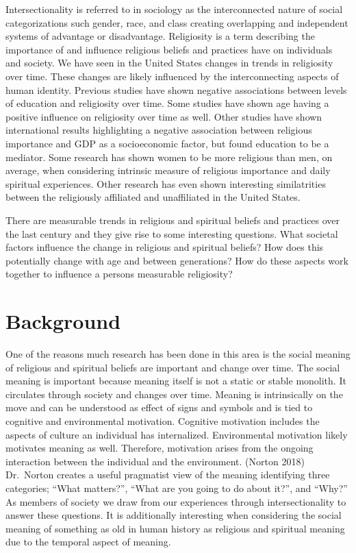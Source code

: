 \documentclass[
  12pt,
  letterpaper,
]{article}
\begin{document}
Intersectionality is referred to in sociology as the interconnected
nature of social categorizations such gender, race, and class creating
overlapping and independent systems of advantage or disadvantage.
Religiosity is a term describing the importance of and influence
religious beliefs and practices have on individuals and society. We have
seen in the United States changes in trends in religiosity over time.
These changes are likely influenced by the interconnecting aspects of
human identity. Previous studies have shown negative associations
between levels of education and religiosity over time. Some studies have
shown age having a positive influence on religiosity over time as well.
Other studies have shown international results highlighting a negative
association between religious importance and GDP as a socioeconomic
factor, but found education to be a mediator. Some research has shown
women to be more religious than men, on average, when considering
intrinsic measure of religious importance and daily spiritual
experiences. Other research has even shown interesting similatrities
between the religiously affiliated and unaffiliated in the United
States.

There are measurable trends in religious and spiritual beliefs and
practices over the last century and they give rise to some interesting
questions. What societal factors influence the change in religious and
spiritual beliefs? How does this potentially change with age and between
generations? How do these aspects work together to influence a persons
measurable religiosity?

\hypertarget{background}{%
\section{Background}\label{background}}

One of the reasons much research has been done in this area is the
social meaning of religious and spiritual beliefs are important and
change over time. The social meaning is important because meaning itself
is not a static or stable monolith. It circulates through society and
changes over time. Meaning is intrinsically on the move and can be
understood as effect of signs and symbols and is tied to cognitive and
environmental motivation. Cognitive motivation includes the aspects of
culture an individual has internalized. Environmental motivation likely
motivates meaning as well. Therefore, motivation arises from the ongoing
interaction between the individual and the environment. (Norton 2018)
Dr.~Norton creates a useful pragmatist view of the meaning identifying
three categories; ``What matters?'', ``What are you going to do about
it?'', and ``Why?'' As members of society we draw from our experiences
through intersectionality to answer these questions. It is additionally
interesting when considering the social meaning of something as old in
human history as religious and spiritual meaning due to the temporal
aspect of meaning.
\end{document}
